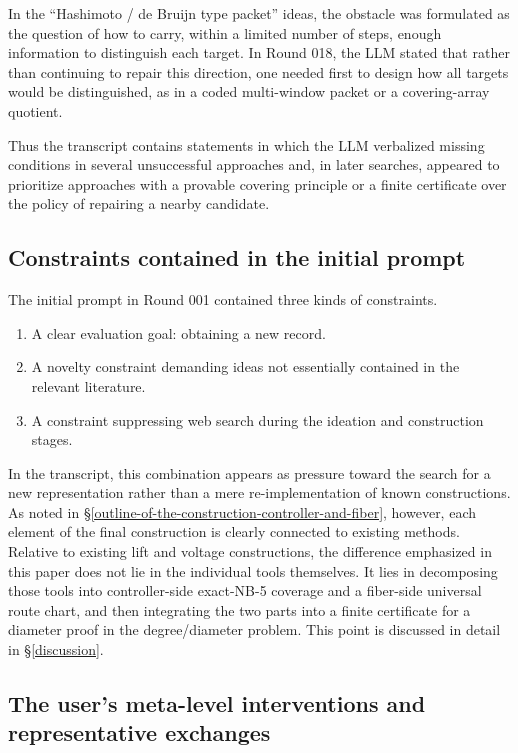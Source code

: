 \documentclass[11pt]{article}
\theoremstyle{definition}
\theoremstyle{remark}
\providecommand{\tightlist}{\setlength{\itemsep}{0pt}\setlength{\parskip}{0pt}}
\renewcommand{\_}{\textunderscore\allowbreak}
\begin{document}
In the ``Hashimoto / de Bruijn type packet'' ideas, the obstacle was
formulated as the question of how to carry, within a limited number of
steps, enough information to distinguish each target. In Round 018, the
LLM stated that rather than continuing to repair this direction, one
needed first to design how all targets would be distinguished, as in a
coded multi-window packet or a covering-array quotient.

Thus the transcript contains statements in which the LLM verbalized
missing conditions in several unsuccessful approaches and, in later
searches, appeared to prioritize approaches with a provable covering
principle or a finite certificate over the policy of repairing a nearby
candidate.

\subsection{Constraints contained in the initial
prompt}\label{constraints-contained-in-the-initial-prompt}

The initial prompt in Round 001 contained three kinds of constraints.

\begin{enumerate}
\def\labelenumi{\arabic{enumi}.}
\tightlist
\item
  A clear evaluation goal: obtaining a new record.
\item
  A novelty constraint demanding ideas not essentially contained in the
  relevant literature.
\item
  A constraint suppressing web search during the ideation and
  construction stages.
\end{enumerate}

In the transcript, this combination appears as pressure toward the
search for a new representation rather than a mere re-implementation of
known constructions. As noted in \S\ref{outline-of-the-construction-controller-and-fiber}, however, each element of the
final construction is clearly connected to existing methods. Relative to
existing lift and voltage constructions, the difference emphasized in
this paper does not lie in the individual tools themselves. It lies in
decomposing those tools into controller-side exact-NB-5 coverage and a
fiber-side universal route chart, and then integrating the two parts
into a finite certificate for a diameter proof in the degree/diameter
problem. This point is discussed in detail in \S\ref{discussion}.

\subsection{The user's meta-level interventions and representative
exchanges}\label{the-users-meta-level-interventions-and-representative-exchanges}
\end{document}
